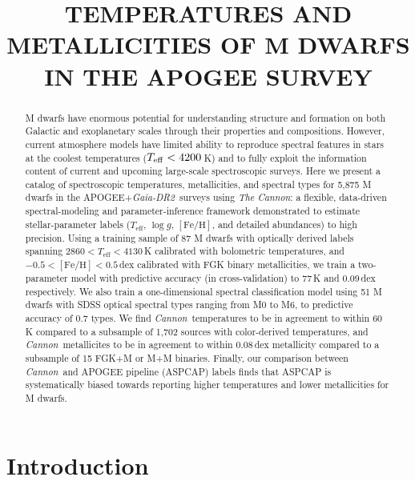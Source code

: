 \documentclass[twocolumn]{aastex62}
\newcommand{\thecannon}{\textsl{The Cannon}}
\newcommand{\cannon}{\textsl{Cannon}}
\newcommand{\drtwo}{\textsl{Gaia-DR2}}
\newcommand{\teff}{T_{\mathrm{eff}}}
\newcommand{\logg}{\log g}
\newcommand{\feh}{[{\mathrm{Fe}/\mathrm{H}}]}
\begin{document}
\raggedbottom\sloppy\sloppypar\frenchspacing

\title{TEMPERATURES AND METALLICITIES OF M DWARFS IN THE APOGEE SURVEY}

\begin{abstract}

M dwarfs have enormous potential for understanding structure and
formation on both Galactic and exoplanetary scales
through their properties and compositions.
However, current atmosphere models
have limited ability to reproduce spectral features in stars at the 
coolest temperatures ($T_{\rm eff} < 4200\,$K) and to fully
exploit the information content of current and upcoming large-scale spectroscopic surveys.
Here we present a catalog of spectroscopic temperatures, metallicities, and
spectral types for 5,875 M dwarfs in the APOGEE+\drtwo\ surveys using
\thecannon: a flexible, data-driven spectral-modeling and
parameter-inference framework demonstrated to estimate
stellar-parameter labels ($\teff$, $\logg$, $\feh$, and detailed
abundances) to high precision.
Using a training sample of 87 M dwarfs with optically derived labels spanning 
$2860 < \teff < 4130$\,K calibrated with bolometric temperatures, and
$-0.5 < \feh < 0.5$\,dex calibrated with FGK binary metallicities, 
we train a two-parameter model with predictive accuracy (in cross-validation) 
to 77\,K and 0.09\,dex respectively.
We also train a one-dimensional spectral classification model using 51 M dwarfs
with SDSS optical spectral types ranging from M0 to M6, to predictive accuracy of
0.7 types. 
We find \cannon\ temperatures to be in agreement to within 60\,K
compared to a subsample of 1,702 sources with color-derived temperatures, and 
\cannon\ metallicites to be in agreement to within 0.08\,dex metallicity
compared to a subsample of 15 FGK+M or M+M binaries. 
Finally, our comparison between \cannon\ and APOGEE pipeline (ASPCAP) labels finds that 
ASPCAP is systematically biased towards reporting higher temperatures and lower metallicities 
for M dwarfs. 
\end{abstract}


\section{Introduction} \label{sec:intro}
\end{document}
